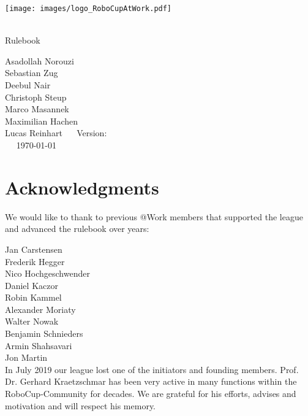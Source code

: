 
\begin{titlepage}
  \begin{center}
    {

      \texttt{[image: images/logo\_RoboCupAtWork.pdf]}\\[1.23ex]
    }
    \vspace{2.7 cm}
    \hrulefill\par
    {%
      \vspace*{.27cm}
      \Huge{\RCAW}\\[1.23ex]
      \Large Rulebook \\[2ex]
    }

    \hrulefill\par

    \vfill
    Asadollah Norouzi\\
  	Sebastian Zug\\
    Deebul Nair \\
    Christoph Steup \\
    Marco Masannek\\
    Maximilian Hachen\\
    Lucas Reinhart
    \vfill
    ~~ Version: \YEAR ~~ \\
    ~~  \today ~~ \\
  \end{center}

\newpage

\section*{Acknowledgments}

We would like to thank to previous @Work members that supported the league and
advanced the rulebook over years:

Jan Carstensen \\
Frederik Hegger\\
Nico Hochgeschwender \\
Daniel Kaczor \\
Robin Kammel \\
Alexander Moriaty \\
Walter Nowak \\
Benjamin Schnieders\\
Armin Shahsavari \\
Jon Martin \\


In July 2019 our league lost one of the initiators and founding members. Prof. Dr. Gerhard
Kraetzschmar has been very active in many functions within the RoboCup-Community
for decades. We are grateful for his efforts, advises and motivation and will respect his memory.


\end{titlepage}
